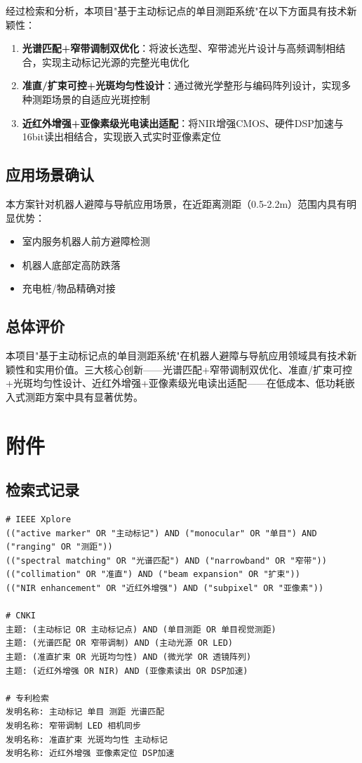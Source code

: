 \documentclass[12pt, a4paper]{ctexart}
\begin{document}
经过检索和分析，本项目"基于主动标记点的单目测距系统"在以下方面具有技术新颖性：

\begin{enumerate}
\item \textbf{光谱匹配+窄带调制双优化}：将波长选型、窄带滤光片设计与高频调制相结合，实现主动标记光源的完整光电优化
\item \textbf{准直/扩束可控+光斑均匀性设计}：通过微光学整形与编码阵列设计，实现多种测距场景的自适应光斑控制
\item \textbf{近红外增强+亚像素级光电读出适配}：将NIR增强CMOS、硬件DSP加速与16bit读出相结合，实现嵌入式实时亚像素定位
\end{enumerate}

\subsection{应用场景确认}

本方案针对机器人避障与导航应用场景，在近距离测距（0.5-2.2m）范围内具有明显优势：

\begin{itemize}
\item 室内服务机器人前方避障检测
\item 机器人底部定高防跌落
\item 充电桩/物品精确对接
\end{itemize}

\subsection{总体评价}

本项目"基于主动标记点的单目测距系统"在机器人避障与导航应用领域具有技术新颖性和实用价值。三大核心创新——光谱匹配+窄带调制双优化、准直/扩束可控+光斑均匀性设计、近红外增强+亚像素级光电读出适配——在低成本、低功耗嵌入式测距方案中具有显著优势。

\section{附件}

\subsection{检索式记录}

\begin{verbatim}
# IEEE Xplore
(("active marker" OR "主动标记") AND ("monocular" OR "单目") AND ("ranging" OR "测距"))
(("spectral matching" OR "光谱匹配") AND ("narrowband" OR "窄带"))
(("collimation" OR "准直") AND ("beam expansion" OR "扩束"))
(("NIR enhancement" OR "近红外增强") AND ("subpixel" OR "亚像素"))

# CNKI
主题: (主动标记 OR 主动标记点) AND (单目测距 OR 单目视觉测距)
主题: (光谱匹配 OR 窄带调制) AND (主动光源 OR LED)
主题: (准直扩束 OR 光斑均匀性) AND (微光学 OR 透镜阵列)
主题: (近红外增强 OR NIR) AND (亚像素读出 OR DSP加速)

# 专利检索
发明名称: 主动标记 单目 测距 光谱匹配
发明名称: 窄带调制 LED 相机同步
发明名称: 准直扩束 光斑均匀性 主动标记
发明名称: 近红外增强 亚像素定位 DSP加速
\end{verbatim}
\end{document}
